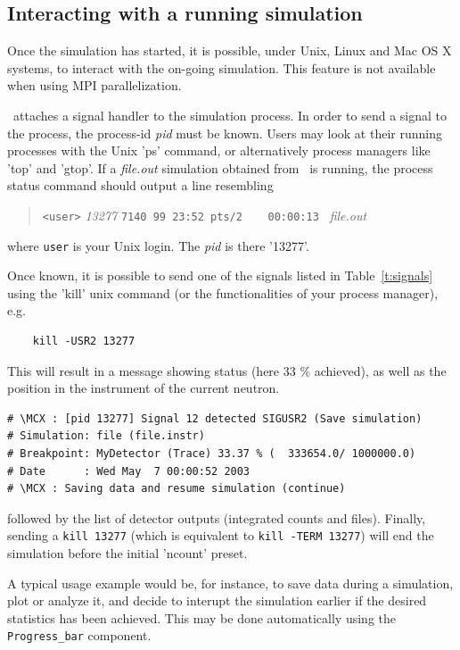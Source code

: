 \subsection{Interacting with a running simulation}

Once the simulation has started, it is possible, under Unix, Linux and Mac OS X systems, to interact with the on-going simulation. This feature is not available when using MPI parallelization.

\MCX\ attaches a signal handler to the simulation process. In order to send a signal to the process, the process-id \textit{pid} must be known. Users may look at their running processes with the Unix 'ps' command, or alternatively process managers like 'top' and 'gtop'.
If a \textit{file.out} simulation obtained from \MCX\ is running, the process status command should output a line resembling
\begin{quote}
  \verb|<user>| \textit{13277} \verb|7140 99 23:52 pts/2    00:00:13 | \textit{file.out}\\
\end{quote}
where \verb+user+ is your Unix login. The \textit{pid} is there '13277'.

Once known, it is possible to send one of the signals listed in Table~\ref{t:signals} using the 'kill' unix command (or the functionalities of your process manager), e.g.
\begin{verbatim}
    kill -USR2 13277
\end{verbatim}
This will result in a message showing status (here 33 \% achieved), as well as the position in the instrument of the current neutron.
\begin{verbatim}
# \MCX : [pid 13277] Signal 12 detected SIGUSR2 (Save simulation)
# Simulation: file (file.instr)
# Breakpoint: MyDetector (Trace) 33.37 % (  333654.0/ 1000000.0)
# Date      : Wed May  7 00:00:52 2003
# \MCX : Saving data and resume simulation (continue)
\end{verbatim}
followed by the list of detector outputs (integrated counts and files). Finally, sending a \verb+kill 13277+ (which is equivalent to \verb+kill -TERM 13277+) will end the simulation before the initial 'ncount' preset.

A typical usage example would be, for instance, to save data during a
simulation, plot or analyze it, and decide to interupt the simulation
earlier if the desired statistics has been achieved. This may be done automatically using the \verb+Progress_bar+ component.

